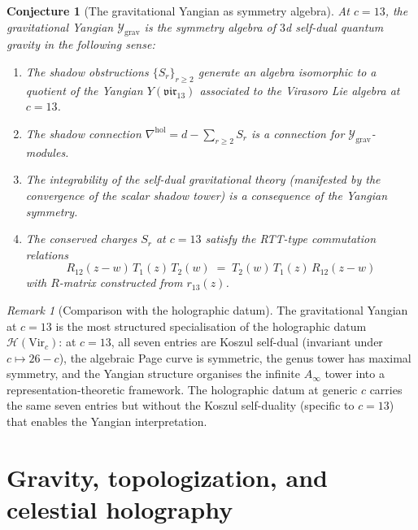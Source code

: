 \documentclass[11pt,reqno]{amsart}
\newtheorem{conjecture}[theorem]{Conjecture}
\theoremstyle{definition}
\theoremstyle{remark}
\newtheorem{remark}[theorem]{Remark}
\begin{document}
\begin{conjecture}[The gravitational Yangian as symmetry algebra]
\label{conj:yangian-symmetry}
At $c = 13$, the gravitational Yangian
$\mathcal{Y}_{\mathrm{grav}}$ is the symmetry algebra of $3$d
self-dual quantum gravity in the following sense:
\begin{enumerate}[label=\textup{(\roman*)}]
\item The shadow obstructions $\{S_r\}_{r \ge 2}$ generate an
  algebra isomorphic to a quotient of the Yangian
  $Y(\mathfrak{vir}_{13})$ associated to the Virasoro Lie algebra
  at $c = 13$.
\item The shadow connection
  $\nabla^{\mathrm{hol}} = d - \sum_{r \ge 2} S_r$ is a
  connection for $\mathcal{Y}_{\mathrm{grav}}$-modules.
\item The integrability of the self-dual gravitational theory
  (manifested by the convergence of the scalar shadow tower)
  is a consequence of the Yangian symmetry.
\item The conserved charges $S_r$ at $c = 13$ satisfy the
  RTT-type commutation relations
  \begin{equation}\label{eq:yangian-rtt}
  R_{12}(z-w)\,T_1(z)\,T_2(w)
  \;=\;
  T_2(w)\,T_1(z)\,R_{12}(z-w)
  \end{equation}
  with $R$-matrix constructed from $r_{13}(z)$.
\end{enumerate}
\end{conjecture}

\begin{remark}[Comparison with the holographic datum]
\label{rem:yangian-holographic}
The gravitational Yangian at $c = 13$ is the most structured
specialisation of the holographic datum
$\mathcal{H}(\mathrm{Vir}_c)$: at $c = 13$, all seven entries
are Koszul self-dual (invariant under $c \mapsto 26 - c$),
the algebraic Page curve is symmetric, the genus tower has
maximal symmetry, and the Yangian structure organises the
infinite
$A_\infty$ tower into a representation-theoretic framework.
The holographic datum at generic $c$ carries the same seven
entries but without the Koszul self-duality (specific to
$c = 13$) that enables the Yangian interpretation.
\end{remark}


\section{Gravity, topologization, and celestial holography}
\label{sec:3dqg-climax}
\end{document}
